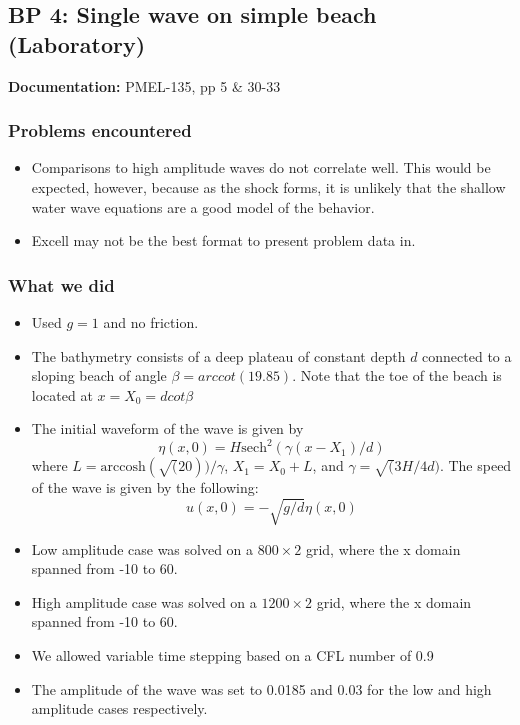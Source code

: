 \newsection

\subsection{BP 4:
 Single wave on simple beach (Laboratory)}


{\bf Documentation:}  PMEL-135, pp 5 \& 30-33

\subsubsection{Problems encountered}

\begin{itemize}
\item Comparisons to high amplitude waves do not correlate well. This would be expected, however, because as the shock forms, it is unlikely that the shallow water wave equations are a good model of the behavior.
\item Excell may not be the best format to present problem data in. 
\end{itemize}

\subsubsection{What we did}

\begin{itemize}
\item Used $g=1$ and no friction.
\item The bathymetry consists of a deep plateau of constant depth $d$ connected to a sloping beach of angle $\beta = arccot(19.85)$. Note that the toe of the beach is located at $x = X_0 = d cot \beta$
\item The initial waveform of the wave is given by 
\begin{equation}
\eta(x,0) = H \text{sech}^2(\gamma (x - X_1)/d)
\end{equation}
where $L = \text{arccosh}(\sqrt(20))/\gamma$, $X_1 = X_0 + L$, 
and $\gamma = \sqrt(3H/4d)$. The speed of the wave is given by the following: 
\begin{equation}
u(x,0)=-\sqrt{g/d}\eta(x,0)
\end{equation}
\item Low amplitude case was solved on a $800\times 2$ grid, where the x domain spanned from -10 to 60.
\item High amplitude case was solved on a $1200\times 2$ grid, where the x domain spanned from -10 to 60.
\item We allowed variable time stepping based on a CFL number of 0.9
\item The amplitude of the wave was set to 0.0185 and 0.03 for the low and high amplitude cases respectively. 
\end{itemize} 

